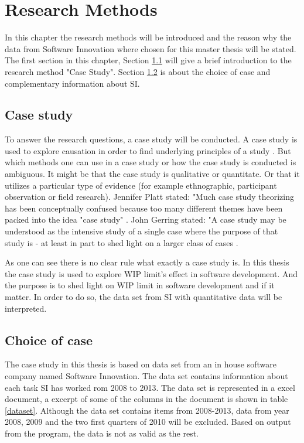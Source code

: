 \documentclass[UKenglish]{ifimaster}  %
\begin{document}
\chapter{Research Methods}
\label{chap:RM}
In this chapter the research methods will be introduced and the reason why the data from Software Innovation where chosen for this master thesis will be stated. The first section in this chapter, Section \ref{sec:CS} will give a brief introduction to the research method "Case Study".  Section \ref{sec:coc} is about the choice of case and complementary information about SI. 


\section{Case study}
\label{sec:CS}
To answer the research questions, a case study will be conducted.  A case study is used to explore causation in order to find underlying principles of a study \parencite{0078285763}\parencite{9781412960991}.  But which methods one can use in a case study or how the case study is conducted is ambiguous.  It might be that the case study is qualitative or quantitate.  Or that it utilizes a particular type of evidence (for example ethnographic, participant observation or field research).  Jennifer Platt stated: "Much case study theorizing has been conceptually confused because too many different themes have been packed into the idea "case study" \parencite{0521676568}.  John Gerring stated: "A case study may be understood as the intensive study of a single case where the purpose of that study is - at least in part to shed light on a larger class of cases  \parencite{0521676568}.



As one can see there is no clear rule what exactly a case study is. In this thesis the case study is used to explore WIP limit's effect in software development.  And the purpose is to shed light on WIP limit in software development and if it matter. In order to do so, the data set from SI with quantitative data will be interpreted.

\section{Choice of case}
\label{sec:coc}
The case study in this thesis is based on data set from an in house software company named Software Innovation. The data set contains information about each task SI has worked rom 2008 to 2013. The data set is represented in a excel document, a excerpt of some of the columns in the document is shown in table \ref{dataset}. Although the data set contains items from 2008-2013, data from year 2008, 2009 and the two first quarters of 2010 will be excluded. Based on output from the program, the data is not as valid as the rest. 
\end{document}
